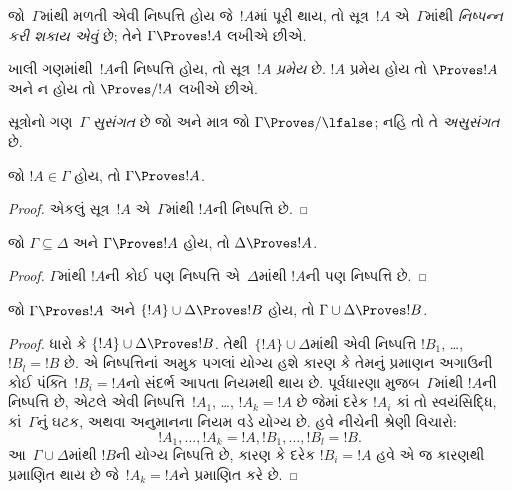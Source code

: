 \begin{defn}[નિષ્પન્નક્ષમતા]
જો~$\Gamma$માંથી મળતી એવી નિષ્પત્તિ હોય જે~$!A$માં પૂરી થાય,
તો સૂત્ર~$!A$ એ~$\Gamma$માંથી \emph{નિષ્પન્ન કરી શકાય એવું} છે; તેને
$\Gamma \Proves !A$ લખીએ છીએ.
\end{defn}

\begin{defn}[પ્રમેયો]
ખાલી ગણમાંથી~$!A$ની નિષ્પત્તિ હોય, તો સૂત્ર~$!A$
\emph{પ્રમેય} છે. $!A$ પ્રમેય હોય તો $\Proves !A$ અને ન હોય તો
$\Proves/ !A$ લખીએ છીએ.
\end{defn}

\begin{defn}[સુસંગતતા]
સૂત્રોનો ગણ~$\Gamma$ \emph{સુસંગત} છે જો અને માત્ર જો
$\Gamma\Proves/ \lfalse$; નહિ તો તે \emph{અસુસંગત} છે.
\end{defn}

\begin{prop}[સ્વવાચકતા]
જો $!A \in \Gamma$ હોય, તો $\Gamma \Proves !A$.
\end{prop}

\begin{proof}
  એકલું સૂત્ર~$!A$ એ~$\Gamma$માંથી $!A$ની નિષ્પત્તિ છે.
\end{proof}

\begin{prop}
જો $\Gamma \subseteq \Delta$ અને $\Gamma \Proves !A$ હોય, તો
$\Delta \Proves !A$.
\end{prop}

\begin{proof}
$\Gamma$માંથી $!A$ની કોઈ પણ નિષ્પત્તિ એ~$\Delta$માંથી $!A$ની પણ
નિષ્પત્તિ છે.
\end{proof}

\begin{prop}[પરંપરિતતા]
જો $\Gamma \Proves !A$ અને $\{!A\} \cup \Delta \Proves !B$ હોય, તો
$\Gamma \cup \Delta \Proves !B$.
\end{prop}

\begin{proof}
  ધારો કે $\{!A\} \cup \Delta \Proves !B$. તેથી~$\{!A\} \cup
  \Delta$માંથી એવી નિષ્પત્તિ $!B_1$, \dots, $!B_l = !B$ છે.
  એ નિષ્પત્તિનાં અમુક પગલાં યોગ્ય હશે કારણ કે તેમનું પ્રમાણન
  અગાઉની કોઈ પંક્તિ~$!B_i = !A$નો સંદર્ભ આપતા નિયમથી થાય છે. પૂર્વધારણા
  મુજબ~$\Gamma$માંથી $!A$ની નિષ્પત્તિ છે, એટલે એવી
  નિષ્પત્તિ~$!A_1$, \dots, $!A_k = !A$ છે જેમાં દરેક $!A_i$ કાં
  તો સ્વયંસિદ્ધિ, કાં~$\Gamma$નું ઘટક, અથવા અનુમાનના નિયમ વડે
  યોગ્ય છે. હવે નીચેની શ્રેણી વિચારો:
  \[
  !A_1, \dots, !A_k = !A, !B_1, \dots, !B_l = !B.
  \]
  આ~$\Gamma \cup \Delta$માંથી $!B$ની યોગ્ય નિષ્પત્તિ છે, કારણ કે
  દરેક $!B_i = !A$ હવે એ જ કારણથી પ્રમાણિત થાય છે જે~$!A_k = !A$ને
  પ્રમાણિત કરે છે.
\end{proof}


